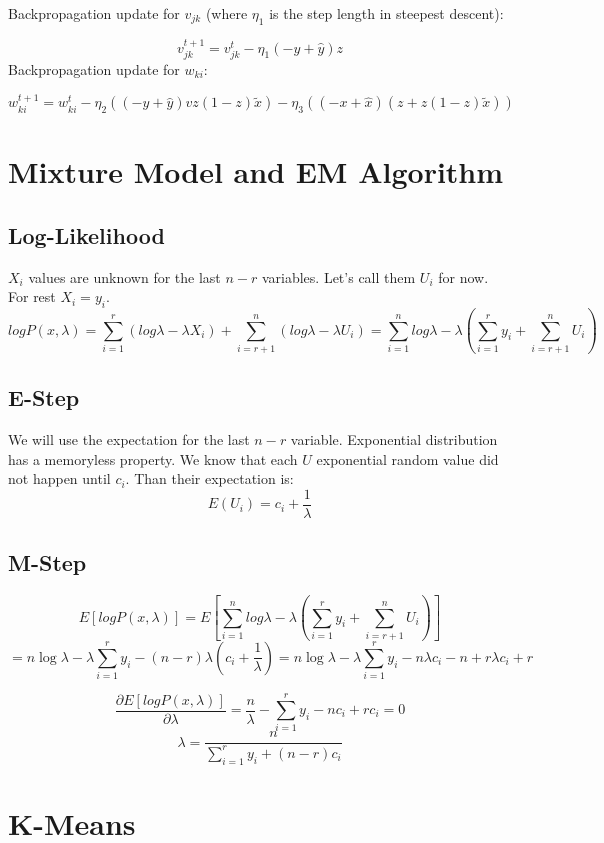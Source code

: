 \documentclass[letter,11pt]{article}
\begin{document}
        Backpropagation update for $v_{jk}$ (where $\eta_1$ is the step length in steepest descent):
        
        $$ v_{jk}^{t+1} = v_{jk}^{t} -\eta_1(-y+\hat{y})z $$
        Backpropagation update for $w_{ki}$:
        
        $$  w_{ki}^{t+1} = w_{ki}^{t} -\eta_2  ((-y + \hat{y})vz(1-z)\tilde{x}) -\eta_3 ((-x + \hat{x})(z+z(1-z)\tilde{x}))$$
        
	\section{Mixture Model and EM Algorithm}
	
	\subsection{Log-Likelihood}
	$X_i$ values are unknown for the last $n-r$ variables. Let's call them $U_i$ for now. For rest $X_i = y_i$.
	$$ log P(x,\lambda) = \sum_{i = 1}^{r}(log \lambda - \lambda X_i) + \sum_{i = r+1}^{n} (log \lambda - \lambda U_i) = \sum_{i = 1}^{n} log \lambda - \lambda(\sum_{i =1}^{r} y_i + \sum_{i = r+1}^{n} U_i)$$
	\subsection{E-Step}
	
	We will use the expectation for the last $n-r$ variable. Exponential distribution has a memoryless property. We know that each $U$ exponential random value did not happen until $c_i$. Than their expectation is:
	$$ E(U_i) = c_i + \frac{1}{\lambda} $$
	
	\subsection{M-Step}
	$$E[log P(x,\lambda)] = E[\sum_{i = 1}^{n} log \lambda - \lambda(\sum_{i =1}^{r} y_i + \sum_{i = r+1}^{n} U_i)]$$
	$$ = n \log \lambda -\lambda \sum_{i = 1}^{r} y_i - (n-r)\lambda (c_i + \frac{1}{\lambda} )= n \log \lambda -\lambda \sum_{i = 1}^{r} y_i - n\lambda c_i - n +r \lambda c_i + r$$
	
	$$\frac{\partial E[log P(x,\lambda)]}{\partial \lambda} = \frac{n}{\lambda} - \sum_{i=1}^{r} y_i - nc_i + rc_i = 0$$
	\begin{equation}
	\lambda = \frac{n}{\sum_{i = 1}^{r} y_i + (n-r)c_i}
	\end{equation}
		\section{K-Means}
		
\end{document}
